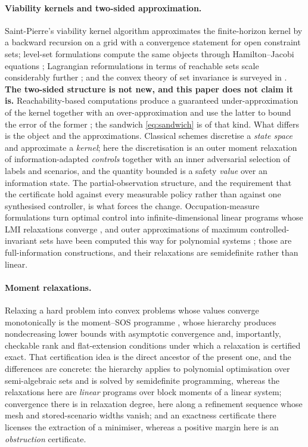 \documentclass[11pt,a4paper]{article}
\theoremstyle{plain}
\theoremstyle{definition}
\theoremstyle{remark}
\begin{document}
\paragraph{Viability kernels and two-sided approximation.}
Saint-Pierre's viability kernel algorithm \cite{SaintPierre1994} approximates the finite-horizon kernel by a backward recursion on a grid with a convergence statement for open constraint sets; level-set formulations compute the same objects through Hamilton--Jacobi equations \cite{MitchellBayenTomlin2005}; Lagrangian reformulations in terms of reachable sets scale considerably further \cite{Maidens2013}; and the convex theory of set invariance is surveyed in \cite{Blanchini1999}. \textbf{The two-sided structure is not new, and this paper does not claim it is.} Reachability-based computations produce a guaranteed under-approximation of the kernel together with an over-approximation and use the latter to bound the error of the former \cite[Section~3]{Maidens2013}; the sandwich \eqref{eq:sandwich} is of that kind. What differs is the object and the approximations. Classical schemes discretise a \emph{state space} and approximate a \emph{kernel}; here the discretisation is an outer moment relaxation of information-adapted \emph{controls} together with an inner adversarial selection of labels and scenarios, and the quantity bounded is a safety \emph{value} over an information state. The partial-observation structure, and the requirement that the certificate hold against every measurable policy rather than against one synthesised controller, is what forces the change. Occupation-measure formulations turn optimal control into infinite-dimensional linear programs \cite{Vinter1993} whose LMI relaxations converge \cite{Lasserre2008}, and outer approximations of maximum controlled-invariant sets have been computed this way for polynomial systems \cite{Korda2014}; those are full-information constructions, and their relaxations are semidefinite rather than linear.

\paragraph{Moment relaxations.}
Relaxing a hard problem into convex problems whose values converge monotonically is the moment--SOS programme \cite{Lasserre2001,Parrilo2003}, whose hierarchy produces nondecreasing lower bounds with asymptotic convergence and, importantly, checkable rank and flat-extension conditions under which a relaxation is certified exact. That certification idea is the direct ancestor of the present one, and the differences are concrete: the hierarchy applies to polynomial optimisation over semi-algebraic sets and is solved by semidefinite programming, whereas the relaxations here are \emph{linear} programs over block moments of a linear system; convergence there is in relaxation degree, here along a refinement sequence whose mesh and stored-scenario widths vanish; and an exactness certificate there licenses the extraction of a minimiser, whereas a positive margin here is an \emph{obstruction} certificate.
\end{document}
